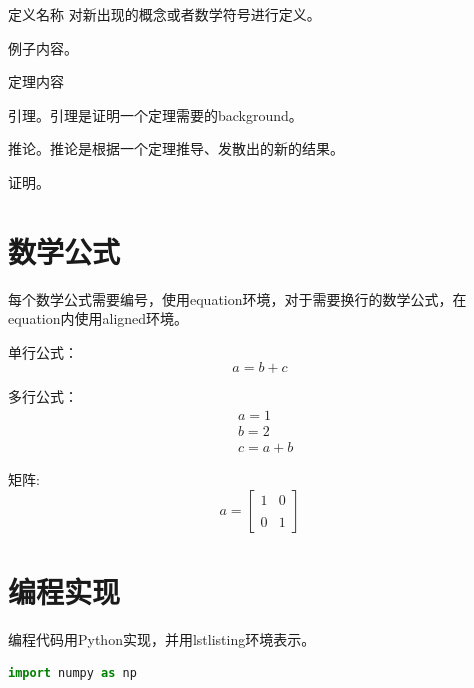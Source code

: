 \documentclass[a4paper,9pt]{extarticle}
\begin{document}
\begin{multicols*}{2}
\begin{mydef}{定义名称}
    对新出现的概念或者数学符号进行定义。
\end{mydef}

\begin{example}
    例子内容。
\end{example}

\begin{theorem}
    定理内容
\end{theorem}

\begin{lemma}
    引理。引理是证明一个定理需要的background。
\end{lemma}

\begin{corollary}
    推论。推论是根据一个定理推导、发散出的新的结果。
\end{corollary}

\begin{pr}
    证明。
\end{pr}


\section{数学公式}

    每个数学公式需要编号，使用equation环境，对于需要换行的数学公式，在equation内使用aligned环境。
    
    单行公式：
    \begin{equation}
        a = b + c
    \end{equation}
    
    多行公式：
    \begin{equation}
        \begin{aligned}
        & a = 1 \\
        & b = 2 \\
        & c = a + b
        \end{aligned}
    \end{equation}
    
    矩阵:
    \begin{equation}
        a = \begin{bmatrix} 
            1 & 0 \\\\
            0 & 1 
            \end{bmatrix}
    \end{equation}
\section{编程实现}
    编程代码用Python实现，并用lstlisting环境表示。
    \begin{lstlisting}[language=Python]
    import numpy as np
    

\end{lstlisting}
\end{multicols*}
\end{document}
